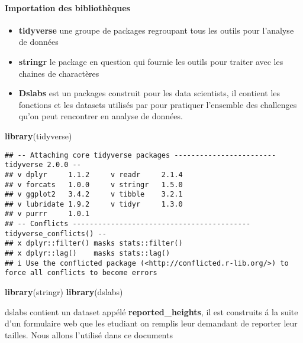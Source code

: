 \documentclass[
]{article}
\newenvironment{Shaded}{\begin{snugshade}}{\end{snugshade}}
\newcommand{\FunctionTok}[1]{\textcolor[rgb]{0.13,0.29,0.53}{\textbf{#1}}}
\newcommand{\NormalTok}[1]{#1}
\begin{document}
\hypertarget{importation-des-bibliothuxe8ques}{%
\paragraph{Importation des
bibliothèques}\label{importation-des-bibliothuxe8ques}}

\begin{itemize}
\item
  \textbf{tidyverse} une groupe de packages regroupant tous les outils
  pour l'analyse de données
\item
  \textbf{stringr} le package en question qui fournie les outils pour
  traiter avec les chaines de charactères
\item
  \textbf{Dslabs} est un packages construit pour les data scientists, il
  contient les fonctions et les datasets utilisés par pour pratiquer
  l'ensemble des challenges qu'on peut rencontrer en analyse de données.
\end{itemize}

\begin{Shaded}
\begin{Highlighting}[]
\FunctionTok{library}\NormalTok{(tidyverse)}
\end{Highlighting}
\end{Shaded}

\begin{verbatim}
## -- Attaching core tidyverse packages ------------------------ tidyverse 2.0.0 --
## v dplyr     1.1.2     v readr     2.1.4
## v forcats   1.0.0     v stringr   1.5.0
## v ggplot2   3.4.2     v tibble    3.2.1
## v lubridate 1.9.2     v tidyr     1.3.0
## v purrr     1.0.1     
## -- Conflicts ------------------------------------------ tidyverse_conflicts() --
## x dplyr::filter() masks stats::filter()
## x dplyr::lag()    masks stats::lag()
## i Use the conflicted package (<http://conflicted.r-lib.org/>) to force all conflicts to become errors
\end{verbatim}

\begin{Shaded}
\begin{Highlighting}[]
\FunctionTok{library}\NormalTok{(stringr)}
\FunctionTok{library}\NormalTok{(dslabs)}
\end{Highlighting}
\end{Shaded}

dslabs contient un dataset appélé \textbf{reported\_heights}, il est
construits á la suite d'un formulaire web que les etudiant on remplis
leur demandant de reporter leur tailles. Nous allons l'utilisé dans ce
documents
\end{document}
